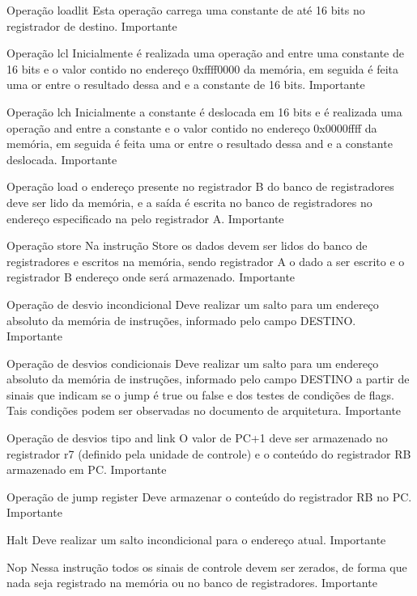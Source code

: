 \documentclass{report}
\begin{document}
\begin{functional}
      \requirement
      {Operação loadlit}
      {Esta operação carrega uma constante de até 16 bits no registrador de destino.}
      {Importante}
      
       \requirement
      {Operação lcl}
      {Inicialmente é realizada uma operação and entre uma constante de 16 bits e o valor contido no endereço 0xffff0000 da memória, em seguida é feita uma or entre o resultado dessa and e a constante de 16 bits.}
      {Importante}
      
       \requirement
      {Operação lch}
      {Inicialmente a constante é deslocada em 16 bits e é realizada uma operação and entre a constante e o valor contido no endereço 0x0000ffff da memória, em seguida é feita uma or entre o resultado dessa and e a constante deslocada.}
      {Importante}
      
       \requirement
      {Operação load}
      {o endereço presente no registrador B do banco de registradores deve ser lido da memória, e a saída é escrita no banco de registradores no endereço especificado na pelo registrador A.}
      {Importante}
      
      \requirement
      {Operação store}
      {Na instrução Store os dados devem ser lidos do banco de registradores e escritos na memória, sendo registrador A o dado a ser escrito e o registrador B endereço onde será armazenado.}
      {Importante}
      
       \requirement
      {Operação de desvio incondicional}
      {Deve realizar um salto para um endereço absoluto da memória de instruções, informado pelo campo DESTINO.}
      {Importante}
      
       \requirement
      {Operação de desvios condicionais}
      {Deve realizar um salto para um endereço absoluto da memória de instruções, informado pelo campo DESTINO a partir de sinais que indicam se o jump é true ou false e dos testes de condições de flags. Tais condições podem ser observadas no documento de arquitetura.}
      {Importante}
      
      \requirement
      {Operação de desvios tipo and link}
      {O valor de PC+1 deve ser armazenado no registrador r7 (definido pela unidade de controle) e o conteúdo do registrador RB armazenado em PC.}
      {Importante}
      
       \requirement
      {Operação de jump register}
      {Deve armazenar o conteúdo do registrador RB no PC.}
      {Importante}
      
      \requirement
      {Halt}
      {Deve realizar um salto incondicional para o endereço atual.}
      {Importante}
      
      \requirement
      {Nop}
      {Nessa instrução todos os sinais de controle devem ser zerados, de forma que nada seja registrado na memória ou no banco de registradores.}
      {Importante}
      
    \end{functional}
\end{document}
